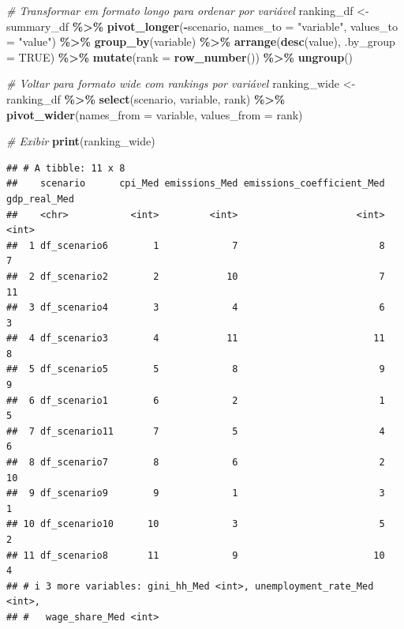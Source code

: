 \documentclass[
]{article}
\newenvironment{Shaded}{\begin{snugshade}}{\end{snugshade}}
\newcommand{\AttributeTok}[1]{\textcolor[rgb]{0.13,0.29,0.53}{#1}}
\newcommand{\CommentTok}[1]{\textcolor[rgb]{0.56,0.35,0.01}{\textit{#1}}}
\newcommand{\ConstantTok}[1]{\textcolor[rgb]{0.56,0.35,0.01}{#1}}
\newcommand{\FunctionTok}[1]{\textcolor[rgb]{0.13,0.29,0.53}{\textbf{#1}}}
\newcommand{\NormalTok}[1]{#1}
\newcommand{\OtherTok}[1]{\textcolor[rgb]{0.56,0.35,0.01}{#1}}
\newcommand{\SpecialCharTok}[1]{\textcolor[rgb]{0.81,0.36,0.00}{\textbf{#1}}}
\newcommand{\StringTok}[1]{\textcolor[rgb]{0.31,0.60,0.02}{#1}}
\begin{document}
\begin{Shaded}
\begin{Highlighting}[]
\CommentTok{\# Transformar em formato longo para ordenar por variável}
\NormalTok{ranking\_df }\OtherTok{\textless{}{-}}\NormalTok{ summary\_df }\SpecialCharTok{\%\textgreater{}\%}
  \FunctionTok{pivot\_longer}\NormalTok{(}\SpecialCharTok{{-}}\NormalTok{scenario, }\AttributeTok{names\_to =} \StringTok{"variable"}\NormalTok{, }\AttributeTok{values\_to =} \StringTok{"value"}\NormalTok{) }\SpecialCharTok{\%\textgreater{}\%}
  \FunctionTok{group\_by}\NormalTok{(variable) }\SpecialCharTok{\%\textgreater{}\%}
  \FunctionTok{arrange}\NormalTok{(}\FunctionTok{desc}\NormalTok{(value), }\AttributeTok{.by\_group =} \ConstantTok{TRUE}\NormalTok{) }\SpecialCharTok{\%\textgreater{}\%}
  \FunctionTok{mutate}\NormalTok{(}\AttributeTok{rank =} \FunctionTok{row\_number}\NormalTok{()) }\SpecialCharTok{\%\textgreater{}\%}
  \FunctionTok{ungroup}\NormalTok{()}

\CommentTok{\# Voltar para formato wide com rankings por variável}
\NormalTok{ranking\_wide }\OtherTok{\textless{}{-}}\NormalTok{ ranking\_df }\SpecialCharTok{\%\textgreater{}\%}
  \FunctionTok{select}\NormalTok{(scenario, variable, rank) }\SpecialCharTok{\%\textgreater{}\%}
  \FunctionTok{pivot\_wider}\NormalTok{(}\AttributeTok{names\_from =}\NormalTok{ variable, }\AttributeTok{values\_from =}\NormalTok{ rank)}

\CommentTok{\# Exibir}
\FunctionTok{print}\NormalTok{(ranking\_wide)}
\end{Highlighting}
\end{Shaded}

\begin{verbatim}
## # A tibble: 11 x 8
##    scenario      cpi_Med emissions_Med emissions_coefficient_Med gdp_real_Med
##    <chr>           <int>         <int>                     <int>        <int>
##  1 df_scenario6        1             7                         8            7
##  2 df_scenario2        2            10                         7           11
##  3 df_scenario4        3             4                         6            3
##  4 df_scenario3        4            11                        11            8
##  5 df_scenario5        5             8                         9            9
##  6 df_scenario1        6             2                         1            5
##  7 df_scenario11       7             5                         4            6
##  8 df_scenario7        8             6                         2           10
##  9 df_scenario9        9             1                         3            1
## 10 df_scenario10      10             3                         5            2
## 11 df_scenario8       11             9                        10            4
## # i 3 more variables: gini_hh_Med <int>, unemployment_rate_Med <int>,
## #   wage_share_Med <int>
\end{verbatim}
\end{document}
